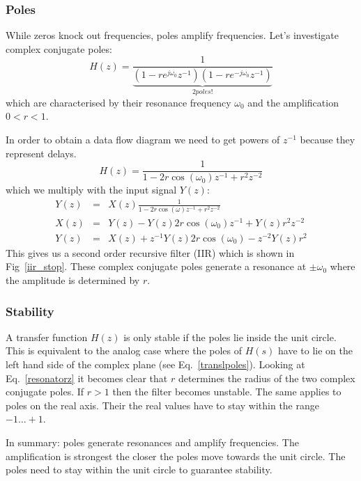 \documentclass[12pt,a4paper]{article}
\begin{document}
\subsubsection{Poles}
While zeros knock out frequencies, poles amplify frequencies.
Let's investigate complex conjugate poles:
\begin{equation}
H(z) = \frac{1}{\underbrace{(1 - r e^{j \omega_{0}} z^{-1})(1 - r e^{-j \omega_{0}} z^{-1})}_{2 poles!}} 
\label{resonatorz}
\end{equation}
which are characterised by their resonance frequency $\omega_0$
and the amplification $0<r<1$.

In order to obtain a data flow diagram we need to get powers of $z^{-1}$
because they represent delays.
\begin{equation}
H(z) = \frac{1}{1 - 2 r \cos(\omega_{0}) z^{-1} + r^{2} z^{-2}} 
\end{equation}
which we multiply with the input signal $Y(z)$:
\begin{eqnarray} 
Y(z) & = & X(z) \frac{1}{1 - 2 r \cos (\omega) z^{-1} + r^{2} z^{-2}} \\
X(z) & = & Y(z) - Y(z) 2r \cos (\omega_{0}) z^{-1} + Y(z) r^{2} z^{-2} \\
Y(z) & = & X(z) + z^{-1} Y(z) 2r \cos (\omega_{0}) - z^{-2} Y(z) r^{2}
\end{eqnarray}
This gives us a second order recursive filter (IIR) which is
shown in Fig~\ref{iir_stop}. These complex
conjugate poles generate a resonance at $\pm\omega_0$ where the
amplitude is determined by $r$.

\subsubsection{Stability}
A transfer function $H(z)$ is only stable if the poles lie inside the
unit circle. This is equivalent to the analog case where the poles of
$H(s)$ have to lie on the left hand side of the complex plane (see
Eq.~\ref{translpoles}). Looking at Eq.~\ref{resonatorz} it becomes
clear that $r$ determines the radius of the two complex conjugate poles. If
$r>1$ then the filter becomes unstable. The same applies to poles on
the real axis. Their the real values have to stay within the range $-1
\ldots +1$.

In summary: poles generate resonances and amplify frequencies. The
amplification is strongest the closer the poles move towards the unit
circle. The poles need to stay within the unit circle to guarantee
stability. 
\end{document}

